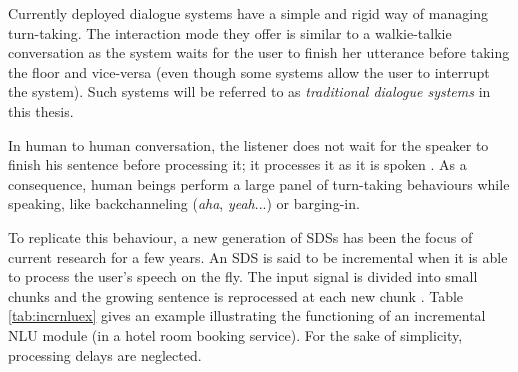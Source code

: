 	    	Currently deployed dialogue systems have a simple and rigid way of managing turn-taking. The interaction mode they offer is similar to a walkie-talkie conversation as the system waits for the user to finish her utterance before taking the floor and vice-versa (even though some systems allow the user to interrupt the system). Such systems will be referred to as \textit{traditional dialogue systems} in this thesis.
        
    	    In human to human conversation, the listener does not wait for the speaker to finish his sentence before processing it; it processes it as it is spoken \cite{Tanenhaus1995}. As a consequence, human beings perform a large panel of turn-taking behaviours while speaking, like backchanneling (\textit{aha}, \textit{yeah}...) or barging-in.
            
            To replicate this behaviour, a new generation of SDSs has been the focus of current research for a few years. An SDS is said to be incremental when it is able to process the user's speech on the fly. The input signal is divided into small chunks and the growing sentence is reprocessed at each new chunk \cite{Schlangen2011}. Table \ref{tab:incrnluex} gives an example illustrating the functioning of an incremental NLU module (in a hotel room booking service). For the sake of simplicity, processing delays are neglected.
						
